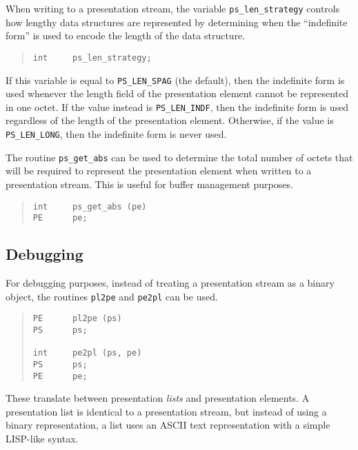 When writing to a presentation stream,
the variable \verb"ps_len_strategy" controls how lengthy data structures
are represented by determining when the ``indefinite form'' is used to encode
the length of the data structure.
\begin{quote}\small\begin{verbatim}
int     ps_len_strategy;
\end{verbatim}\end{quote}
If this variable is equal to \verb"PS_LEN_SPAG" (the default),
then the indefinite form is used whenever the length field of the
presentation element cannot be represented in one octet.
If the value instead is \verb"PS_LEN_INDF",
then the indefinite form is used regardless of the length of the
presentation element.
Otherwise,
if the value is \verb"PS_LEN_LONG",
then the indefinite form is never used.

The routine \verb"ps_get_abs" can be used to determine the total number of
octets that will be required to represent the presentation element
when written to a presentation stream.
This is useful for buffer management purposes.
\begin{quote}\small\begin{verbatim}
int     ps_get_abs (pe)
PE      pe;
\end{verbatim}\end{quote}

\subsection	{Debugging}
For debugging purposes,
instead of treating a presentation stream as a binary object,
the routines \verb"pl2pe" and \verb"pe2pl" can be used.
\begin{quote}\small\begin{verbatim}
PE      pl2pe (ps)
PS      ps;

int     pe2pl (ps, pe)
PS      ps;
PE      pe;
\end{verbatim}\end{quote}
These translate between presentation {\em lists\/} and presentation elements.
A presentation list is identical to a presentation stream,
but instead of using a binary representation,
a list uses an ASCII text representation
with a simple LISP-like syntax.

